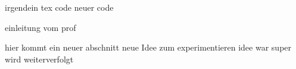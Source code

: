 irgendein tex code
neuer code

einleitung vom prof

hier kommt ein neuer abschnitt
neue Idee zum experimentieren
idee war super wird weiterverfolgt
